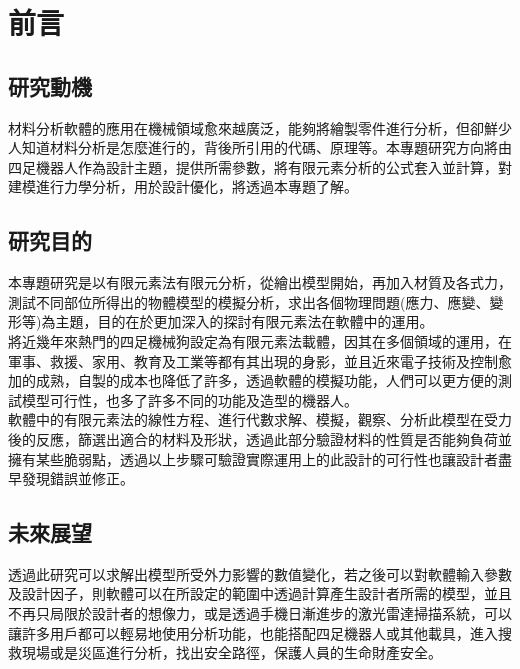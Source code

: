 \chapter{前言}
\renewcommand{\baselinestretch}{10.0} %
\setcounter{page}{1}  %
\fontsize{14pt}{2.5pt}\sectionef
\section{研究動機}
材料分析軟體的應用在機械領域愈來越廣泛，能夠將繪製零件進行分析，但卻鮮少人知道材料分析是怎麼進行的，背後所引用的代碼、原理等。本專題研究方向將由四足機器人作為設計主題，提供所需參數，將有限元素分析的公式套入並計算，對建模進行力學分析，用於設計優化，將透過本專題了解。

\section{研究目的}
本專題研究是以有限元素法有限元分析，從繪出模型開始，再加入材質及各式力，測試不同部位所得出的物體模型的模擬分析，求出各個物理問題(應力、應變、變形等)為主題，目的在於更加深入的探討有限元素法在軟體中的運用。\\

將近幾年來熱門的四足機械狗設定為有限元素法載體，因其在多個領域的運用，在軍事、救援、家用、教育及工業等都有其出現的身影，並且近來電子技術及控制愈加的成熟，自製的成本也降低了許多，透過軟體的模擬功能，人們可以更方便的測試模型可行性，也多了許多不同的功能及造型的機器人。\\

軟體中的有限元素法的線性方程、進行代數求解、模擬，觀察、分析此模型在受力後的反應，篩選出適合的材料及形狀，透過此部分驗證材料的性質是否能夠負荷並擁有某些脆弱點，透過以上步驟可驗證實際運用上的此設計的可行性也讓設計者盡早發現錯誤並修正。\\

\section{未來展望}
透過此研究可以求解出模型所受外力影響的數值變化，若之後可以對軟體輸入參數及設計因子，則軟體可以在所設定的範圍中透過計算產生設計者所需的模型，並且不再只局限於設計者的想像力，或是透過手機日漸進步的激光雷達掃描系統，可以讓許多用戶都可以輕易地使用分析功能，也能搭配四足機器人或其他載具，進入搜救現場或是災區進行分析，找出安全路徑，保護人員的生命財產安全。\\


